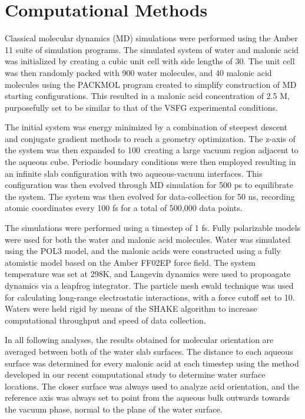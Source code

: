 \section {Computational Methods}

Classical molecular dynamics (MD) simulations were performed using the Amber 11 suite of simulation programs.\cite{Case2010,Pearlman1995} The simulated system of water and malonic acid was initialized by creating a cubic unit cell with side lengths of 30\angs. The unit cell was then randomly packed with 900 water molecules, and 40 malonic acid molecules using the PACKMOL program created to simplify construction of MD starting configurations.\cite{Martinez2009} This resulted in a malonic acid concentration of 2.5 M, purposefully set to be similar to that of the VSFG experimental conditions.

The initial system was energy minimized by a combination of steepest descent and conjugate gradient methods to reach a geometry optimization. The z-axis of the system was then expanded to 100\angs~creating a large vacuum region adjacent to the aqueous cube. Periodic boundary conditions were then employed resulting in an infinite slab configuration with two aqueous-vacuum interfaces. This configuration was then evolved through MD simulation for 500 ps to equilibrate the system. The system was then evolved for data-collection for 50 ns, recording atomic coordinates every 100 fs for a total of 500,000 data points.

The simulations were performed using a timestep of 1 fs. Fully polarizable models were used for both the water and malonic acid molecules. Water was simulated using the POL3 model,\cite{Caldwell1995} and the malonic acids were constructed using a fully atomistic model based on the Amber FF02EP force field.\cite{Case2005} The system temperature was set at 298K, and Langevin dynamics were used to propoagate dynamics via a leapfrog integrator. The particle mesh ewald technique was used for calculating long-range electrostatic interactions, with a force cutoff set to 10\angs. Waters were held rigid by means of the SHAKE algorithm to increase computational throughput and speed of data collection.

In all following analyses, the results obtained for molecular orientation are averaged between both of the water slab surfaces. The distance to each aqueous surface was determined for every malonic acid at each timestep using the method developed in our recent computational study to determine water surface locations.\cite{Shamay2011} The closer surface was always used to analyze acid orientation, and the reference axis was always set to point from the aqueous bulk outwards towards the vacuum phase, normal to the plane of the water surface.
